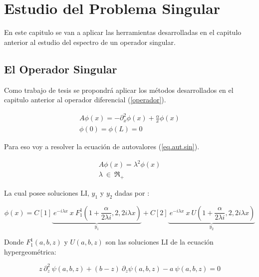 \chapter{Estudio del Problema Singular}

En este capitulo se van a aplicar las herramientas desarrolladas en el capitulo anterior al estudio del espectro de un operador singular.

\section{El Operador Singular}

Como trabajo de tesis se propondrá aplicar los métodos desarrollados en el capitulo anterior al operador diferencial (\ref{operador}).

\begin{equation}
\begin{array}{c}
    A \phi (x) = - \partial ^2 _x  \phi(x) + \frac{\alpha}{x} \phi(x) \\[5pt]
    \phi(0) = \phi(L) = 0 
\end{array}
\label{operador}
\end{equation}

Para eso voy a resolver la ecuación de autovalores (\ref{eq.aut.sin}).

\begin{equation}
\begin{array}{c}
    A  \phi (x)  =   \lambda ^2 \phi (x) \\[5pt]
    \lambda \ \in \ \mathfrak{R} _+
\end{array}
\label{eq.aut.sin}
\end{equation}




La cual posee soluciones LI, $ y_1 $ y $ y_2 $ dadas por :

\begin{equation}
    \phi (x) = 
    C[1]
    \underbrace{
     \ e ^{-i \lambda x} \ x \ F _{1} ^{1} (1+\frac{ \alpha}{2 \lambda i },2,2 i \lambda x) } _ {y_1}
    + C[2] \underbrace{ \ e^{-i \lambda x } \ x \ U (1+\frac{ \alpha}{2 \lambda i },2,2 i \lambda x) } _{y_2} 
\label{eq.phi}
\end{equation}




Donde $F _1 ^1(a,b,z)$ y $ U(a,b,z)$ son las soluciones LI de la ecuación hypergeométrica:

\begin{equation}
    z \ \partial ^2 _z \ \psi (a,b,z) + (b-z) \
    \partial _z \psi (a,b,z)
    -a \ \psi (a,b,z) = 0
\end{equation}


